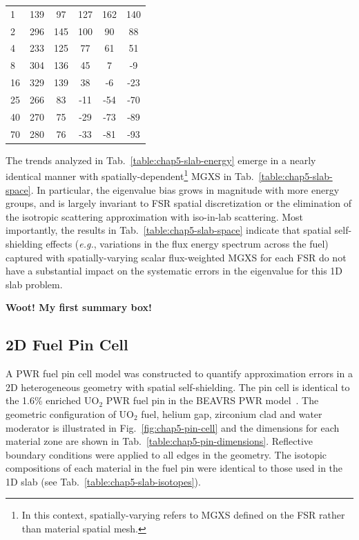 \begin{table}[h!]
\begin{tabular}{a S[table-format=6.1] S[table-format=6.1] S[table-format=6.1] S[table-format=6.1] S[table-format=6.1]}
1 & 139 & 97 & 127 & 162 & 140 \\
2 & 296 & 145 & 100 & 90 & 88 \\
4 & 233 & 125 & 77 & 61 & 51 \\
8 & 304 & 136 & 45 & 7 & -9 \\
16 & 329 & 139 & 38 & -6 & -23 \\
25 & 266 & 83 & -11 & -54 & -70 \\
40 & 270 & 75 & -29 & -73 & -89 \\
70 & 280 & 76 & -33 & -81 & {} -93 \\
  \bottomrule
\end{tabular}
\end{table}

The trends analyzed in Tab.~\ref{table:chap5-slab-energy} emerge in a nearly identical manner with spatially-dependent\footnote{In this context, spatially-varying refers to \ac{MGXS} defined on the \ac{FSR} rather than material spatial mesh.} \ac{MGXS} in Tab.~\ref{table:chap5-slab-space}. In particular, the eigenvalue bias grows in magnitude with more energy groups, and is largely invariant to \ac{FSR} spatial discretization or the elimination of the isotropic scattering approximation with iso-in-lab scattering. Most importantly, the results in Tab.~\ref{table:chap5-slab-space} indicate that spatial self-shielding effects (\textit{e.g.}, variations in the flux energy spectrum across the fuel) captured with spatially-varying scalar flux-weighted \ac{MGXS} for each \ac{FSR} do not have a substantial impact on the systematic errors in the eigenvalue for this 1D slab problem.

\vspace{0.5cm}
\begin{emphbox}
\textbf{Woot! My first summary box!}
\end{emphbox}


\subsection{2D Fuel Pin Cell}
\label{subsec:chap5-pin}

A \ac{PWR} fuel pin cell model was constructed to quantify approximation errors in a 2D heterogeneous geometry with spatial self-shielding. The pin cell is identical to the 1.6\% enriched UO$_2$ \ac{PWR} fuel pin in the \ac{BEAVRS} \ac{PWR} model~\cite{horelik2013beavrs}. The geometric configuration of UO$_2$ fuel, helium gap, zirconium clad and water moderator is illustrated in Fig.~\ref{fig:chap5-pin-cell} and the dimensions for each material zone are shown in Tab.~\ref{table:chap5-pin-dimensions}. Reflective boundary conditions were applied to all edges in the geometry. The isotopic compositions of each material in the fuel pin were identical to those used in the 1D slab (see Tab.~\ref{table:chap5-slab-isotopes}). 

